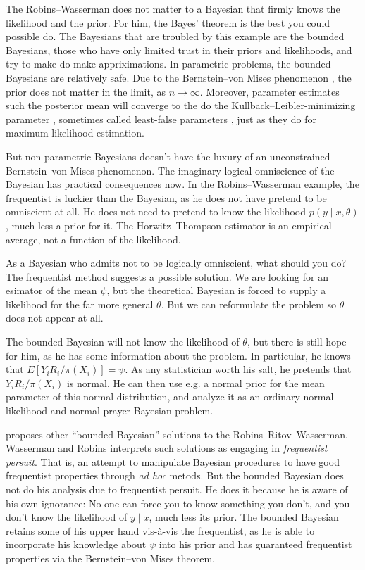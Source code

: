 The Robins--Wasserman does not matter to a Bayesian that firmly knows
the likelihood and the prior. For him, the Bayes' theorem is the best
you could possible do. The Bayesians that are troubled by this example
are the bounded Bayesians, those who have only limited trust in their
priors and likelihoods, and try to make do make appriximations. In
parametric problems, the bounded Bayesians are relatively safe. Due
to the Bernstein--von Mises phenomenon \parencite[Section 10.2]{Van_der_Vaart2000-qc},
the prior does not matter in the limit, as $n\to\infty$. Moreover,
parameter estimates such the posterior mean will converge to the do
the Kullback--Leibler-minimizing parameter \parencite[Theorem 2.1]{Bunke1998-vg},
sometimes called least-false parameters \parencite[p. 25]{Claeskens2008-hk},
just as they do for maximum likelihood estimation.

But non-parametric Bayesians doesn't have the luxury of an unconstrained
Bernstein--von Mises phenomenon. The imaginary logical omniscience
of the Bayesian has practical consequences now. In the Robins--Wasserman
example, the frequentist is luckier than the Bayesian, as he does
not have pretend to be omniscient at all. He does not need to pretend
to know the likelihood $p(y\mid x,\theta)$, much less a prior for
it. The Horwitz--Thompson estimator is an empirical average, not
a function of the likelihood.

As a Bayesian who admits not to be logically omniscient, what should
you do? The frequentist method suggests a possible solution. We are
looking for an esimator of the mean $\psi$, but the theoretical Bayesian
is forced to supply a likelihood for the far more general $\theta$.
But we can reformulate the problem so $\theta$ does not appear at
all. 
\begin{example}
 The bounded Bayesian will not know the likelihood of $\theta$,
but there is still hope for him, as he has some information about
the problem. In particular, he knows that $E[Y_{i}R_{i}/\pi(X_{i})]=\psi$.
As any statistician worth his salt, he pretends that $Y_{i}R_{i}/\pi(X_{i})$
is normal. He can then use e.g. a normal prior for the mean parameter
of this normal distribution, and analyze it as an ordinary normal-likelihood
and normal-prayer Bayesian problem.
\end{example}

\cite{Sims2012-ze} proposes other ``bounded Bayesian'' solutions
to the Robins--Ritov--Wasserman. Wasserman and Robins interprets
such solutions as engaging in\emph{ frequentist persuit}. That is,
an attempt to manipulate Bayesian procedures to have good frequentist
properties through \emph{ad hoc} metods. But the bounded Bayesian
does not do his analysis due to frequentist persuit. He does it because
he is aware of his own ignorance: No one can force you to know something
you don't, and you don't know the likelihood of $y\mid x$, much less
its prior. The bounded Bayesian retains some of his upper hand vis-à-vis
the frequentist, as he is able to incorporate his knowledge about
$\psi$ into his prior and has guaranteed frequentist properties via
the Bernstein--von Mises theorem.

